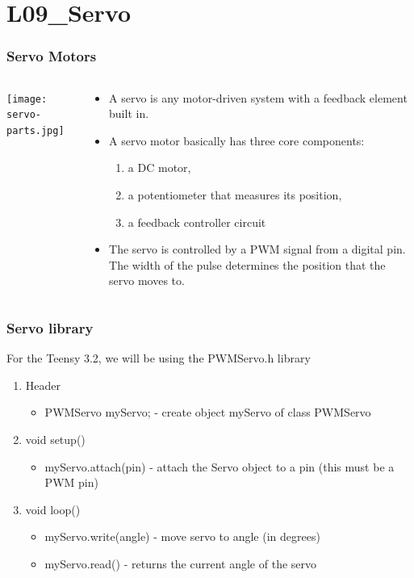 \documentclass{beamer}
\begin{document}
\section{L09\_Servo}

\begin{frame}\frametitle{Servo Motors}
\begin{columns}
\begin{column}{5cm}
	\begin{center}	
	\texttt{[image: servo-parts.jpg]}
	\end{center}
\end{column}
\begin{column}{6cm}
\begin{itemize}
\item A servo is any motor-driven system with a feedback element built in. 
\item A servo motor basically has three core components: 
	\begin{enumerate}
	\item a DC motor,
	\item a potentiometer that measures its position, 
	\item a feedback controller circuit
	\end{enumerate}
\item The servo is controlled by a PWM signal from a digital pin. The width of the pulse determines the position that the servo moves to.
\end{itemize}
\end{column}
\end{columns}
\end{frame}

\begin{frame}\frametitle{Servo library}
For the Teensy 3.2, we will be using the PWMServo.h library

\vspace{0.25cm}

\begin{enumerate}
\item Header
\begin{itemize}
\item PWMServo myServo; - create object myServo of class PWMServo
\end{itemize}

\item void setup()
\begin{itemize}
\item myServo.attach(pin) - attach the Servo object to a pin (this must be a PWM pin)
\end{itemize}

\item void loop()
\begin{itemize}
\item myServo.write(angle) - move servo to angle (in degrees)
\item myServo.read() - returns the current angle of the servo
\end{itemize}
\end{enumerate}

\end{frame}
\end{document}
